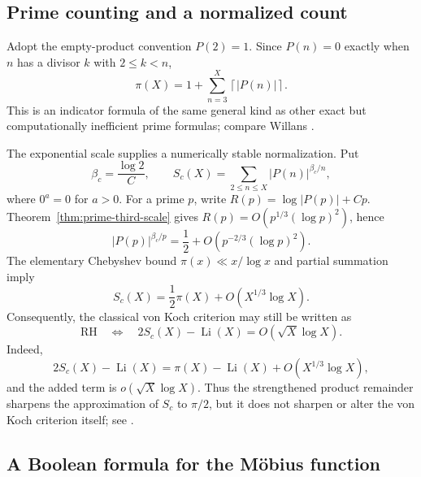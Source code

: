 \documentclass[11pt]{amsart}
\numberwithin{equation}{section}
\theoremstyle{definition}
\theoremstyle{remark}
\newcommand{\Li}{\operatorname{Li}}
\begin{document}
\subsection{Prime counting and a normalized count}

Adopt the empty-product convention \(P(2)=1\).  Since \(P(n)=0\) exactly
when \(n\) has a divisor \(k\) with \(2\leq k<n\),
\begin{equation}\label{eq:prime-count}
 \pi(X)=1+\sum_{n=3}^{X}\left\lceil|P(n)|\right\rceil.
\end{equation}
This is an indicator formula of the same general kind as other exact but
computationally inefficient prime formulas; compare Willans
\cite{Willans1964}.

The exponential scale supplies a numerically stable normalization.  Put
\begin{equation}\label{eq:critical-beta}
 \beta_c=\frac{\log2}{C},
 \qquad
 S_c(X)=\sum_{2\leq n\leq X}|P(n)|^{\beta_c/n},
\end{equation}
where \(0^a=0\) for \(a>0\).  For a prime \(p\), write
\(R(p)=\log|P(p)|+Cp\).  Theorem~\ref{thm:prime-third-scale} gives
\(R(p)=O(p^{1/3}(\log p)^2)\), hence
\begin{equation}\label{eq:critical-weight}
 |P(p)|^{\beta_c/p}
 =\frac12+O\!\left(p^{-2/3}(\log p)^2\right).
\end{equation}
The elementary Chebyshev bound \(\pi(x)\ll x/\log x\) and partial
summation imply
\begin{equation}\label{eq:normalized-count}
 S_c(X)=\frac12\pi(X)+O(X^{1/3}\log X).
\end{equation}
Consequently, the classical von Koch criterion may still be written as
\begin{equation}\label{eq:RH-normalized-count}
 \mathrm{RH}\quad\Longleftrightarrow\quad
 2S_c(X)-\Li(X)=O(\sqrt X\log X).
\end{equation}
Indeed,
\begin{equation}\label{eq:RH-normalized-difference}
 2S_c(X)-\Li(X)
 =\pi(X)-\Li(X)+O(X^{1/3}\log X),
\end{equation}
and the added term is \(o(\sqrt X\log X)\).  Thus the strengthened
product remainder sharpens the approximation of \(S_c\) to \(\pi/2\), but
it does not sharpen or alter the von Koch criterion itself; see
\cite[Chapter~XIV]{TitchmarshHeathBrown1986}.

\subsection{A Boolean formula for the M\"obius function}
\end{document}
